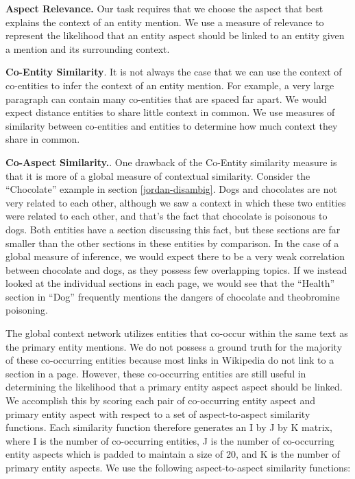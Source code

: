 \textbf{Aspect Relevance.} Our task requires that we choose the aspect that best explains the context of an entity mention. We use a measure of relevance to represent the likelihood that an entity aspect should be linked to an entity given a mention and its surrounding context.

\textbf{Co-Entity Similarity}. It is not always the case that we can use the context of co-entities to infer the context of an entity mention. For example, a very large paragraph can contain many co-entities that are spaced far apart. We would expect distance entities to share little context in common.
We use measures of similarity between co-entities and entities to determine how much context they share in common.

\textbf{Co-Aspect Similarity.}. One drawback of the Co-Entity similarity measure is that it is more of a global measure of contextual similarity. Consider the ``Chocolate'' example in section \ref{jordan-disambig}. Dogs and chocolates are not very related to each other, although we saw a context in which these two entities were related to each other, and that's the fact that chocolate is poisonous to dogs. Both entities have a section discussing this fact, but these sections are far smaller than the other sections in these entities by comparison. In the case of a global measure of inference, we would expect there to be a very weak correlation between chocolate and dogs, as they possess few overlapping topics. If we instead looked at the individual sections in each page, we would see that the ``Health'' section in ``Dog'' frequently mentions the dangers of chocolate and theobromine poisoning. 
 
The global context network utilizes entities that co-occur within the same text as the primary entity mentions. We do not possess a ground truth for the majority of these co-occurring entities because most links in Wikipedia do not link to a section in a page. However, these co-occurring entities are still useful in determining the likelihood that a primary entity aspect aspect should be linked. 
We accomplish this by scoring each pair of co-occurring entity aspect and primary entity aspect with respect to a set of aspect-to-aspect similarity functions. Each similarity function therefore generates an I by J by K matrix, where I is the number of co-occurring entities, J is the number of co-occurring entity aspects which is padded to maintain a size of 20, and K is the number of primary entity aspects. We use the following aspect-to-aspect similarity functions:

